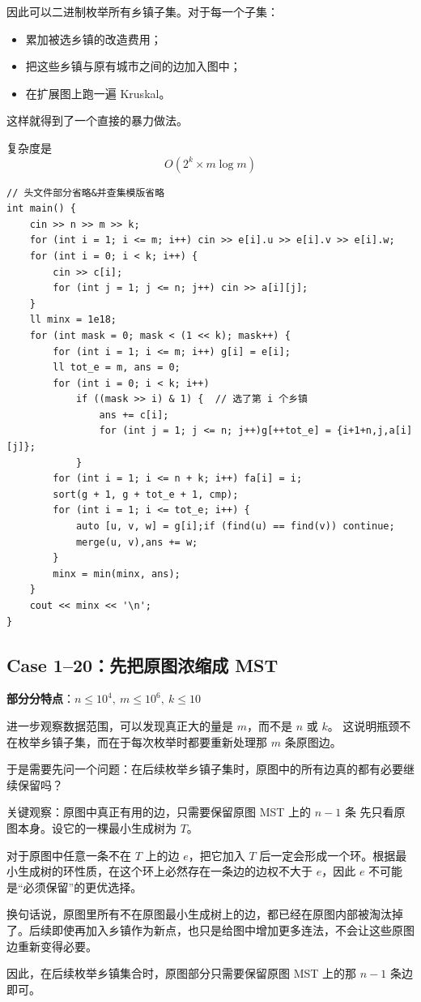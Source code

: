 \documentclass{book}
\begin{document}
因此可以二进制枚举所有乡镇子集。对于每一个子集：

\begin{itemize}[itemsep=2pt, topsep=2pt, parsep=0pt, partopsep=0pt]
    \item 累加被选乡镇的改造费用；
    \item 把这些乡镇与原有城市之间的边加入图中；
    \item 在扩展图上跑一遍 Kruskal。
\end{itemize}

这样就得到了一个直接的暴力做法。

复杂度是
\[
O(2^k \times m \log m)
\]

\begin{lstlisting}[style = code]
// 头文件部分省略&并查集模版省略
int main() {
    cin >> n >> m >> k;
    for (int i = 1; i <= m; i++) cin >> e[i].u >> e[i].v >> e[i].w;
    for (int i = 0; i < k; i++) {
        cin >> c[i];
        for (int j = 1; j <= n; j++) cin >> a[i][j];
    }
    ll minx = 1e18;
    for (int mask = 0; mask < (1 << k); mask++) {
        for (int i = 1; i <= m; i++) g[i] = e[i];
        ll tot_e = m, ans = 0;
        for (int i = 0; i < k; i++) 
            if ((mask >> i) & 1) {  // 选了第 i 个乡镇
                ans += c[i];
                for (int j = 1; j <= n; j++)g[++tot_e] = {i+1+n,j,a[i][j]};
            }
        for (int i = 1; i <= n + k; i++) fa[i] = i;
        sort(g + 1, g + tot_e + 1, cmp);
        for (int i = 1; i <= tot_e; i++) {
            auto [u, v, w] = g[i];if (find(u) == find(v)) continue;
            merge(u, v),ans += w;
        }
        minx = min(minx, ans);
    }
    cout << minx << '\n';
}
\end{lstlisting}

\subsection{Case 1--20：先把原图浓缩成 MST}

\textbf{部分分特点}：$n \le 10^4,\ m \le 10^6,\ k \le 10$

进一步观察数据范围，可以发现真正大的量是 $m$，而不是 $n$ 或 $k$。  
这说明瓶颈不在枚举乡镇子集，而在于每次枚举时都要重新处理那 $m$ 条原图边。

于是需要先问一个问题：在后续枚举乡镇子集时，原图中的所有边真的都有必要继续保留吗？
\begin{keybox}{关键观察：原图中真正有用的边，只需要保留原图 MST 上的 $n-1$ 条}
先只看原图本身。设它的一棵最小生成树为 $T$。

对于原图中任意一条不在 $T$ 上的边 $e$，把它加入 $T$ 后一定会形成一个环。根据最小生成树的环性质，在这个环上必然存在一条边的边权不大于 $e$，因此 $e$ 不可能是“必须保留”的更优选择。

换句话说，原图里所有不在原图最小生成树上的边，都已经在原图内部被淘汰掉了。后续即使再加入乡镇作为新点，也只是给图中增加更多连法，不会让这些原图边重新变得必要。

因此，在后续枚举乡镇集合时，原图部分只需要保留原图 MST 上的那 $n-1$ 条边即可。
\end{keybox}
\end{document}
